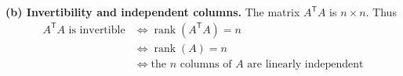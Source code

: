 \documentclass[11pt,a4paper]{article}
\newcommand{\rank}{\operatorname{rank}}
\begin{document}
\textbf{(b) Invertibility and independent columns.} The matrix $A^{\mathsf T}A$ is $n\times n$. Thus
\begin{align*}
A^{\mathsf T}A\text{ is invertible}
&\iff \rank(A^{\mathsf T}A)=n\\
&\iff \rank(A)=n\\
&\iff \text{the $n$ columns of $A$ are linearly independent}
\end{align*}
\end{document}
